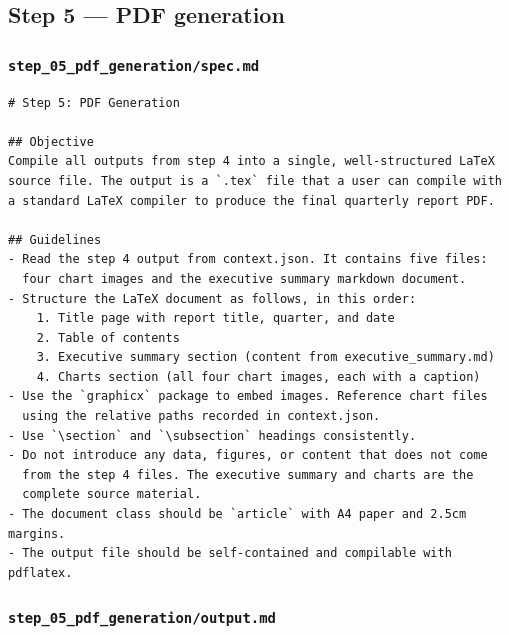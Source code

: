 \documentclass[12pt, a4paper]{article}
\begin{document}
\subsection{Step 5 — PDF generation}

\subsubsection{\texttt{step\_05\_pdf\_generation/spec.md}}

\begin{lstlisting}[language={}]
# Step 5: PDF Generation

## Objective
Compile all outputs from step 4 into a single, well-structured LaTeX
source file. The output is a `.tex` file that a user can compile with
a standard LaTeX compiler to produce the final quarterly report PDF.

## Guidelines
- Read the step 4 output from context.json. It contains five files:
  four chart images and the executive summary markdown document.
- Structure the LaTeX document as follows, in this order:
    1. Title page with report title, quarter, and date
    2. Table of contents
    3. Executive summary section (content from executive_summary.md)
    4. Charts section (all four chart images, each with a caption)
- Use the `graphicx` package to embed images. Reference chart files
  using the relative paths recorded in context.json.
- Use `\section` and `\subsection` headings consistently.
- Do not introduce any data, figures, or content that does not come
  from the step 4 files. The executive summary and charts are the
  complete source material.
- The document class should be `article` with A4 paper and 2.5cm margins.
- The output file should be self-contained and compilable with pdflatex.
\end{lstlisting}

\subsubsection{\texttt{step\_05\_pdf\_generation/output.md}}
\end{document}
